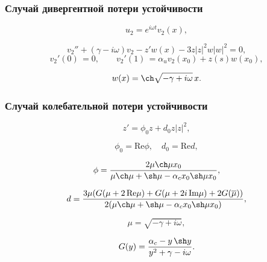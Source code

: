 \documentclass[fullscreen=true, unicode, bookmarks=false]{beamer}
\begin{document}
\begin{frame}
\frametitle{ Случай дивергентной потери устойчивости }

$$ u_2 = e^{i \omega t} v_2(x), $$

\bigskip
\pause

\begin{equation}
	v_2'' + (\gamma - i \omega) v_2 - z' w(x) - 3z|z|^2 w|w|^2 = 0,
\end{equation}
\begin{equation}
	v_2'(0) \, = 0, \qquad v_2'(1) \, = \alpha_u v_2(x_0) + z(s) w(x_0),
\end{equation}

$$ w(x) = \ch \sqrt{-\gamma + i \omega} \, x. $$

\end{frame}

\begin{frame}
\frametitle{ Случай колебательной потери устойчивости }

\begin{equation}
	z' = \phi_0 z + d_0 z |z|^2,
\end{equation}

$$ \phi_0 = \mbox{Re} \phi, \quad d_0 = \mbox{Re} d, $$

\bigskip
\pause

$$ \phi = \frac{ 2 \mu \ch \mu x_0 }{ \mu \ch \mu +\sh \mu - \alpha_c x_0 \sh \mu x_0 }, $$

$$ d = \frac{ 3 \mu ( G(\mu + 2\,\mbox{Re}\mu) + G(\mu + 2i\,\mbox{Im}\mu) + 2G(\overline{\mu}) ) }{ 2 ( \mu \ch \mu +\sh \mu - \alpha_c x_0 \sh \mu x_0 ) }, $$

$$ \mu = \sqrt{-\gamma + i \omega}, $$

$$ G(y) = \frac{ \alpha_c - y\,\sh y }{ y^2 + \gamma - i\omega }. $$

\end{frame}
\end{document}
